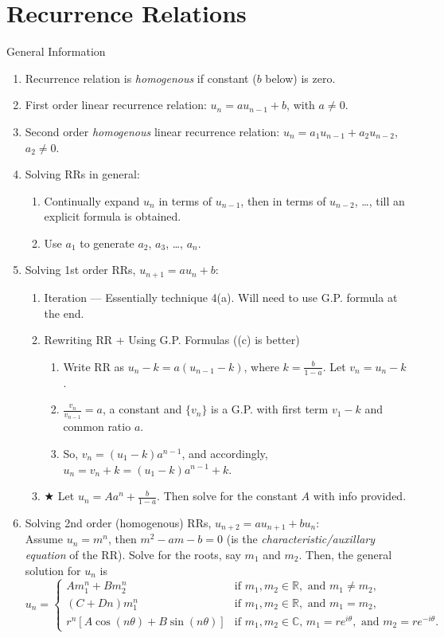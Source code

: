 \documentclass[oneside]{book}
\begin{document}
\chapter{Recurrence Relations}
\begin{stbox}{General Information}{}
  \begin{enumerate}
    \item Recurrence relation is \emph{homogenous} if constant (\(b\) below) is zero.
    \item First order linear recurrence relation: \(u_n=au_{n-1}+b\), with \(a \neq 0\).
    \item Second order \emph{homogenous} linear recurrence relation: \(u_n=a_1u_{n-1}+a_2u_{n-2}\), \(a_2 \neq 0\). 
    \item Solving RRs in general:
    \begin{enumerate}
      \item Continually expand \(u_n\) in terms of \(u_{n-1}\), then in terms of \(u_{n-2}\), \ldots, till an explicit formula is obtained.
      \item Use \(a_1\) to generate \(a_2\), \(a_3\), \ldots, \(a_n\).
    \end{enumerate}
    \item Solving 1st order RRs, \(u_{n+1}=au_{n}+b\):
    \begin{enumerate}
      \item Iteration --- Essentially technique 4(a). Will need to use G.P. formula at the end.
      \item Rewriting RR + Using G.P. Formulas ((c) is better)
      \begin{enumerate}
        \item Write RR as \(u_n-k=a(u_{n-1}-k)\), where \(k=\frac{b}{1-a}\). Let \(v_n=u_n-k\).
        \item \(\frac{v_n}{v_{n-1}}=a\), a constant and \(\{v_n\}\) is a G.P. with first term \(v_1-k\) and common ratio \(a\). 
        \item So, \(v_n=(u_1-k)a^{n-1}\), and accordingly, \(u_n=v_n+k=(u_1-k)a^{n-1}+k\).

      \end{enumerate}
      \item \(\bigstar\) Let \(u_n=Aa^n+\frac{b}{1-a}\). Then solve for the constant \(A\) with info provided.
    \end{enumerate}
    \item Solving 2nd order (homogenous) RRs, \(u_{n+2}=au_{n+1}+bu_n\):\\
    Assume \(u_n=m^n\), then \(m^2-am-b=0\) (is the \emph{characteristic/auxillary equation} of the RR). Solve for the roots, say \(m_1\) and \(m_2\). Then, the general solution for \(u_n\) is
    \[u_n=\begin{cases}
      Am_1^n+Bm_2^n &\text{if } m_1,m_2 \in \mathbb{R}, \text{ and } m_1 \neq m_2,\\
      (C+Dn)m_1^n &\text{if } m_1,m_2 \in \mathbb{R}, \text{ and } m_1=m_2,\\
      r^n[A\cos(n\theta)+B\sin(n\theta)] &\text{if } m_1,m_2 \in \mathbb{C}\text{, }m_1=re^{i\theta}, \text{ and } m_2=re^{-i\theta}.
    \end{cases}\]
  \end{enumerate}
\end{stbox}
\end{document}
